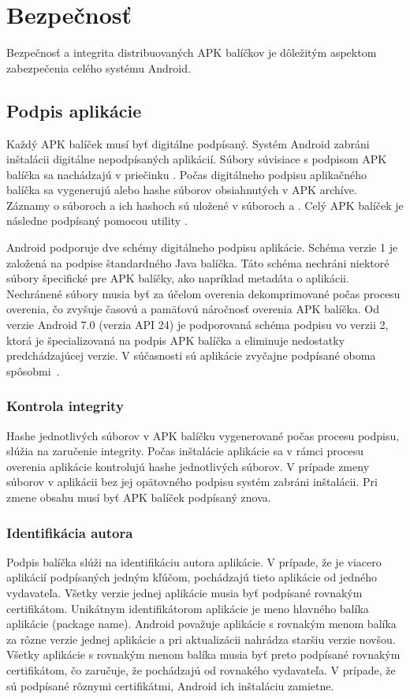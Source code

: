 \section{Bezpečnosť}

Bezpečnosť a integrita distribuovaných APK balíčkov je dôležitým aspektom zabezpečenia celého systému Android.

\subsection{Podpis aplikácie}

Každý APK balíček musí byť digitálne podpísaný. Systém Android zabráni inštalácii digitálne nepodpísaných aplikácií. 
Súbory súvisiace s podpisom APK balíčka sa nachádzajú v priečinku . Počas digitálneho podpisu aplikačného balíčka sa vygenerujú  alebo  hashe súborov obsiahnutých v APK archíve. Záznamy o súboroch a ich hashoch sú uložené v súboroch  a . Celý APK balíček je následne podpísaný pomocou utility . 

Android podporuje dve schémy digitálneho podpisu aplikácie. Schéma verzie 1 je založená na podpise štandardného Java balíčka. Táto schéma nechráni niektoré súbory špecifické pre APK balíčky, ako napríklad metadáta o aplikácii. Nechránené súbory musia byť za účelom overenia dekomprimované počas procesu overenia, čo zvyšuje časovú a pamäťovú náročnosť overenia APK balíčka.  Od verzie Android 7.0 (verzia API 24) je podporovaná schéma podpisu vo verzii 2, ktorá je špecializovaná na podpis APK balíčka a eliminuje nedostatky predchádzajúcej verzie. V súčasnosti sú aplikácie zvyčajne podpísané oboma spôsobmi~\cite{NT0FrzQIkOAYbG2Ga}.

\subsubsection{\textbf{Kontrola integrity}}
Hashe jednotlivých súborov v APK balíčku vygenerované počas procesu podpisu, slúžia na zaručenie integrity. Počas inštalácie aplikácie sa v rámci procesu overenia aplikácie kontrolujú hashe jednotlivých súborov. V prípade zmeny súborov v aplikácii bez jej opätovného podpisu systém zabráni inštalácii. Pri zmene obsahu musí byť APK balíček podpísaný znova. 

\subsubsection{\textbf{Identifikácia autora}}
Podpis balíčka slúži na identifikáciu autora aplikácie. V prípade, že je viacero aplikácií podpísaných jedným kľúčom, pochádzajú tieto aplikácie od jedného vydavateľa. 
Všetky verzie jednej aplikácie musia byť podpísané rovnakým certifikátom. Unikátnym identifikátorom aplikácie je meno hlavného balíka aplikácie (package name). Android považuje aplikácie s rovnakým menom balíka za rôzne verzie jednej aplikácie a pri aktualizácii nahrádza staršiu verzie novšou. Všetky aplikácie s rovnakým menom balíka musia byť preto podpísané rovnakým certifikátom, čo zaručuje, že pochádzajú od rovnakého vydavateľa.  V prípade, že sú podpísané rôznymi certifikátmi, Android ich inštaláciu zamietne. 

